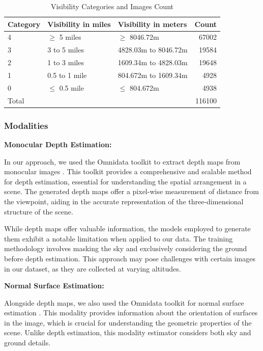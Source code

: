 \begin{table}[htbp]
\centering
\caption{Visibility Categories and Images Count}
\label{tab:vis_img_count}
\begin{tabular}{@{}lllr@{}}
\toprule
Category & Visibility in miles  & Visibility in meters & Count  \\
\midrule
4        & $\geq$ 5 miles             &     $\geq$ 8046.72m                 & 67002  \\
3        & 3 to 5 miles         &      4828.03m to  8046.72m        & 19584  \\
2        & 1 to 3 miles         &            1609.34m to 4828.03m         & 19648  \\
1        & 0.5 to 1 mile  &               804.672m to 1609.34m      & 4928  \\
0        & $\leq$ 0.5 mile   &     $\leq$ 804.672m                 & 4938  \\
\midrule
Total    &    &                      &  116100  \\
\bottomrule
\end{tabular}
\end{table}


\subsubsection{Modalities}
\label{modalities}
\textbf{Monocular Depth Estimation:}

In our approach, we used the Omnidata toolkit to extract depth maps from monocular images \cite{eftekhar2021omnidata, ranftl2021vision}. This toolkit provides a comprehensive and scalable method for depth estimation, essential for understanding the spatial arrangement in a scene. The generated depth maps offer a pixel-wise measurement of distance from the viewpoint, aiding in the accurate representation of the three-dimensional structure of the scene. 

While depth maps offer valuable information, the models employed to generate them exhibit a notable limitation when applied to our data. The training methodology involves masking the sky and exclusively considering the ground before depth estimation. This approach may pose challenges with certain images in our dataset, as they are collected at varying altitudes.

\textbf{Normal Surface Estimation:}

Alongside depth maps, we also used the Omnidata toolkit for normal surface estimation \cite{eftekhar2021omnidata}. This modality provides information about the orientation of surfaces in the image, which is crucial for understanding the geometric properties of the scene. Unlike depth estimation, this modality estimator considers both sky and ground details.


